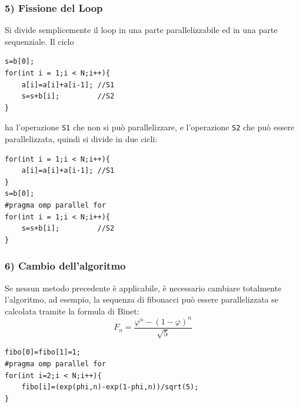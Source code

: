 \documentclass[10pt, letterpaper]{report}
\begin{document}
\subsubsection{5) Fissione del Loop} 
Si divide semplicemente il loop in una parte parallelizzabile ed in una parte sequenziale. Il ciclo
\begin{lstlisting}[style=CStyle]
s=b[0];
for(int i = 1;i < N;i++){
    a[i]=a[i]+a[i-1]; //S1
    s=s+b[i];         //S2
}
\end{lstlisting}
ha l'operazione \texttt{S1} che non si può parallelizzare, e l'operazione \texttt{S2} che può essere parallelizzata, quindi si divide in due cicli:
\begin{lstlisting}[style=CStyle]
for(int i = 1;i < N;i++){
    a[i]=a[i]+a[i-1]; //S1
}
s=b[0];
#pragma omp parallel for 
for(int i = 1;i < N;i++){
    s=s+b[i];         //S2
}
\end{lstlisting}
\subsubsection{6) Cambio dell'algoritmo}
Se nessun metodo precedente è applicabile, è necessario cambiare totalmente l'algoritmo, ad esempio, la sequenza di fibonacci può essere parallelizzata se calcolata tramite la formula di Binet: 
$$F_n=\frac{\varphi^n-(1-\varphi)^n}{\sqrt{5}} $$ 
\begin{lstlisting}[style=CStyle]
fibo[0]=fibo[1]=1;
#pragma omp parallel for 
for(int i=2;i < N;i++){
    fibo[i]=(exp(phi,n)-exp(1-phi,n))/sqrt(5);
}
\end{lstlisting}
\end{document}
